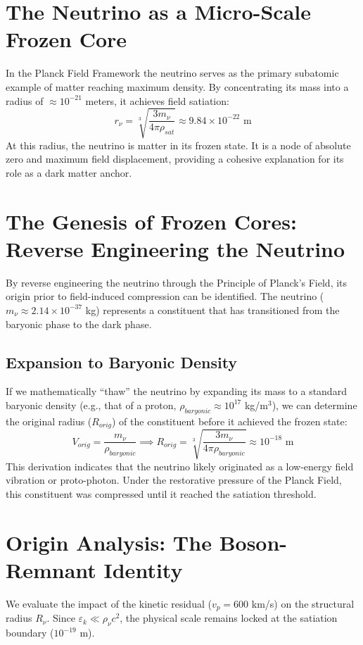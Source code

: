 \section{The Neutrino as a Micro-Scale Frozen Core}
In the Planck Field Framework the neutrino serves as the primary subatomic example of matter reaching maximum density. By concentrating its mass into a radius of $\approx 10^{-21}$ meters, it achieves field satiation:
\begin{equation}
r_{\nu} = \sqrt[3]{\frac{3m_{\nu}}{4\pi \rho_{sat}}} \approx 9.84 \times 10^{-22} \text{ m}
\end{equation}
At this radius, the neutrino is matter in its frozen state. It is a node of absolute zero and maximum field displacement, providing a cohesive explanation for its role as a dark matter anchor.

\section{The Genesis of Frozen Cores: Reverse Engineering the Neutrino}

By reverse engineering the neutrino through the Principle of Planck's Field, its origin prior to field-induced compression can be identified. The neutrino ($m_{\nu} \approx 2.14 \times 10^{-37}$ kg) represents a constituent that has transitioned from the baryonic phase to the dark phase.

\subsection{Expansion to Baryonic Density}
If we mathematically ``thaw'' the neutrino by expanding its mass to a standard baryonic density (e.g., that of a proton, $\rho_{baryonic} \approx 10^{17}$ kg/m$^3$), we can determine the original radius ($R_{orig}$) of the constituent before it achieved the frozen state:
\begin{equation}
V_{orig} = \frac{m_{\nu}}{\rho_{baryonic}} \implies R_{orig} = \sqrt[3]{\frac{3m_{\nu}}{4\pi \rho_{baryonic}}} \approx 10^{-18} \text{ m}
\end{equation}
This derivation indicates that the neutrino likely originated as a low-energy field vibration or proto-photon. Under the restorative pressure of the Planck Field, this constituent was compressed until it reached the satiation threshold.

\section{Origin Analysis: The Boson-Remnant Identity}
We evaluate the impact of the kinetic residual ($v_p = 600$ km/s) on the structural radius $R_{\nu}$. Since $\varepsilon_k \ll \rho_{\nu}c^2$, the physical scale remains locked at the satiation boundary ($10^{-19}$ m). 

